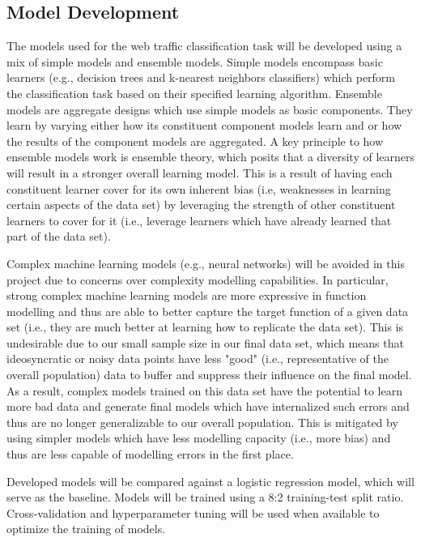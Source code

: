 \documentclass[10pt,sigconf,letterpaper,nonacm]{acmart}
\begin{document}
\subsection{Model Development}

The models used for the web traffic classification task will be developed using a mix of simple models and ensemble models.
Simple models encompass basic learners (e.g., decision trees and k-nearest neighbors classifiers) which perform the classification task based on their specified learning algorithm.
Ensemble models are aggregate designs which use simple models as basic components.
They learn by varying either how its constituent component models learn and or how the results of the component models are aggregated.
A key principle to how ensemble models work is ensemble theory, which posits that a diversity of learners will result in a stronger overall learning model.
This is a result of having each constituent learner cover for its own inherent bias (i.e, weaknesses in learning certain aspects of the data set) by leveraging the strength of other constituent learners to cover for it (i.e., leverage learners which have already learned that part of the data set).

Complex machine learning models (e.g., neural networks) will be avoided in this project due to concerns over complexity modelling capabilities.
In particular, strong complex machine learning models are more expressive in function modelling and thus are able to better capture the target function of a given data set (i.e., they are much better at learning how to replicate the data set).
This is undesirable due to our small sample size in our final data set, which means that ideosyncratic or noisy data points have less "good" (i.e., representative of the overall population) data to buffer and suppress their influence on the final model.
As a result, complex models trained on this data set have the potential to learn more bad data and generate final models which have internalized such errors and thus are no longer generalizable to our overall population.
This is mitigated by using simpler models which have less modelling capacity (i.e., more bias) and thus are less capable of modelling errors in the first place.

Developed models will be compared against a logistic regression model, which will serve as the baseline.
Models will be trained using a 8:2 training-test split ratio.
Cross-validation and hyperparameter tuning will be used when available to optimize the training of models.
\end{document}
